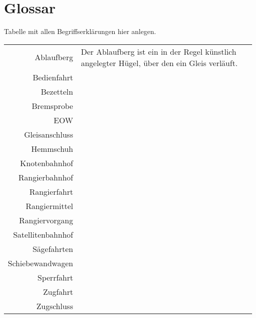 \section{Glossar}
Tabelle mit allen Begriffserklärungen hier anlegen.\\
\begin{tabular}[c]{r|p{12cm}l}
	\hline
	Ablaufberg			&	Der Ablaufberg ist ein in der Regel künstlich angelegter Hügel, über den ein Gleis verläuft.		\\
	
	Bedienfahrt			&		\\
	Bezetteln           &       \\
	Bremsprobe			&		\\
	
	EOW                 &       \\
	
	Gleisanschluss		&		\\
	
	Hemmschuh			&		\\
	
	Knotenbahnhof       &       \\
	
	Rangierbahnhof		&		\\
	Rangierfahrt        &       \\
	Rangiermittel		&		\\
	Rangiervorgang      &       \\
	
	Satellitenbahnhof	&		\\
	Sägefahrten         &       \\
	Schiebewandwagen	&		\\
	Sperrfahrt          &       \\
	
	Zugfahrt			&		\\
	Zugschluss			&		\\
	
	\hline
\end{tabular}